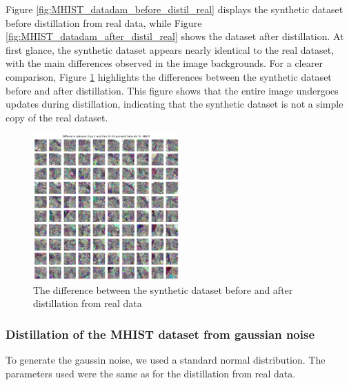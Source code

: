 \documentclass[onecolumn]{IEEEtran}
\begin{document}
Figure \ref{fig:MHIST_datadam_before_distil_real} displays the synthetic dataset before distillation from real data, while Figure \ref{fig:MHIST_datadam_after_distil_real} shows the dataset after distillation. At first glance, the synthetic dataset appears nearly identical to the real dataset, with the main differences observed in the image backgrounds. For a clearer comparison, Figure \ref{fig:MHIST_diff_real} highlights the differences between the synthetic dataset before and after distillation. This figure shows that the entire image undergoes updates during distillation, indicating that the synthetic dataset is not a simple copy of the real dataset.

\begin{figure}[H]
    \centering
    \includegraphics[width=0.5\textwidth]{images/MHIST_diff_real.png}
    \caption{The difference between the synthetic dataset before and after distillation from real data}
    \label{fig:MHIST_diff_real}
\end{figure}

\subsubsection{Distillation of the MHIST dataset from gaussian noise}
To generate the gaussin noise, we used a standard normal distribution. The parameters used were the same as for the distillation from real data.
\end{document}
